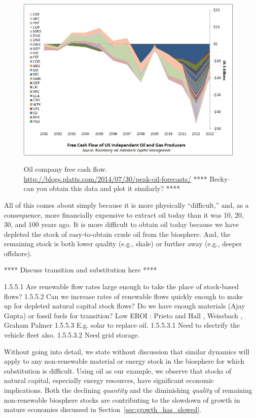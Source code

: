 \begin{figure}[!ht]
\centering\
\includegraphics[width=\linewidth]{Part_0/Chapter_Introduction/images/Cash-Flow.jpg}
\caption[Oil company free cash flow]{Oil company free cash flow.
\url{http://blogs.platts.com/2014/07/30/peak-oil-forecasts/}
**** Becky--can you obtain this data and plot it similarly? ****
}
\label{fig:oil_company_free_cash_flow}
\end{figure}

All of this comes about simply because it is 
more physically ``difficult,'' and, as a consequence, 
more financially expensive
to extract oil today than it was 10, 20, 30, and 100 years ago.
It is more difficult to obtain oil today because we have depleted
the stock of easy-to-obtain crude oil from the biosphere.
And, the remaining stock is both lower quality (e.g., shale)
or further away (e.g., deeper offshore).

**** Discuss transition and substitution here ****

1.5.5.1 Are renewable flow rates large enough to take the place of stock-based flows?
1.5.5.2 Can we increase rates of renewable flows quickly enough to make up for depleted natural capital stock flows?  Do we have enough materials (Ajay Gupta) or fossil fuels for transition?  Low EROI :  Prieto and Hall , Weissbach ,  Graham Palmer 
1.5.5.3 E.g. solar to replace oil.  
1.5.5.3.1 Need to electrify the vehicle fleet also.
1.5.5.3.2 Need grid storage.


Without going into detail, we state without discussion 
that similar dynamics will apply to 
any non-renewable material or energy stock in the biosphere
for which substitution is difficult.
Using oil as our example, we observe that 
stocks of natural capital, especially energy resources,
have significant economic implications.
Both the declining \emph{quantity} and 
the diminishing \emph{quality} of remaining non-renewable biosphere stocks 
are contributing to the slowdown of growth in mature economies
discussed in Section~\ref{sec:growth_has_slowed}.

